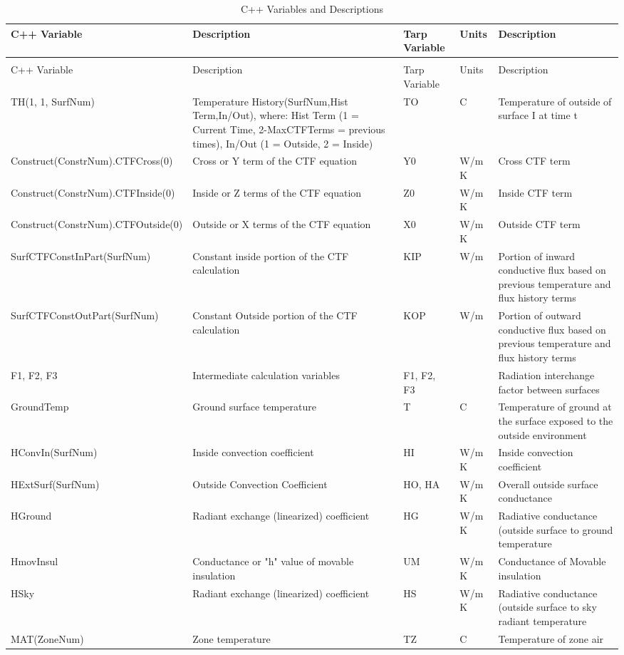 {\scriptsize
\begin{longtable}[c]{p{1.8in}p{1.2in}p{0.9in}p{0.9in}p{1.2in}}

\caption{C++ Variables and Descriptions \label{table:c++-variables-and-descriptions}} \tabularnewline
\toprule
C++ Variable & Description & Tarp Variable & Units & Description \tabularnewline
\midrule
\endfirsthead

\caption[]{C++ Variables and Descriptions} \tabularnewline
\toprule
C++ Variable & Description & Tarp Variable & Units & Description \tabularnewline
\midrule
\endhead

TH(1, 1, SurfNum) & Temperature History(SurfNum,Hist Term,In/Out), where: Hist Term (1 = Current Time, 2-MaxCTFTerms = previous times), In/Out (1 = Outside, 2 = Inside) & TO & C & Temperature of outside of surface I at time t \tabularnewline
Construct(ConstrNum).CTFCross(0) & Cross or Y term of the CTF equation & Y0 & W/m  K & Cross CTF term \tabularnewline
Construct(ConstrNum).CTFInside(0) & Inside or Z terms of the CTF equation & Z0 & W/m  K & Inside CTF term \tabularnewline
Construct(ConstrNum).CTFOutside(0) & Outside or X terms of the CTF equation & X0 & W/m  K & Outside CTF term \tabularnewline
SurfCTFConstInPart(SurfNum) & Constant inside portion of the CTF calculation & KIP & W/m & Portion of inward conductive flux based on previous temperature and flux history terms \tabularnewline
SurfCTFConstOutPart(SurfNum) & Constant Outside portion of the CTF calculation & KOP & W/m & Portion of outward conductive flux based on previous temperature and flux history terms \tabularnewline
F1, F2, F3 & Intermediate calculation variables & F1, F2, F3 & ~ & Radiation interchange factor between surfaces \tabularnewline
GroundTemp & Ground surface temperature & T & C & Temperature of ground at the surface exposed to the outside environment \tabularnewline
HConvIn(SurfNum) & Inside convection coefficient & HI & W/m  K & Inside convection coefficient \tabularnewline
HExtSurf(SurfNum) & Outside Convection Coefficient & HO, HA & W/m  K & Overall outside surface conductance \tabularnewline
HGround & Radiant exchange (linearized) coefficient & HG & W/m  K & Radiative conductance (outside surface to ground temperature \tabularnewline
HmovInsul & Conductance or "h" value of movable insulation & UM & W/m  K & Conductance of Movable insulation \tabularnewline
HSky & Radiant exchange (linearized) coefficient & HS & W/m  K & Radiative conductance (outside surface to sky radiant temperature \tabularnewline
MAT(ZoneNum) & Zone temperature & TZ & C & Temperature of zone air \tabularnewline

\end{longtable}}
